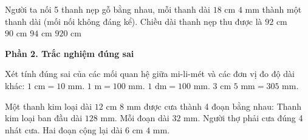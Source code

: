 \begin{ex} %
Người ta nối 5 thanh nẹp gỗ bằng nhau, mỗi thanh dài $18\text{ cm } 4\text{ mm}$ thành một thanh dài (mối nối không đáng kể). Chiều dài thanh nẹp thu được là
\choice
{\True $92\text{ cm}$}
{$90\text{ cm}$}
{$94\text{ cm}$}
{$920\text{ cm}$}
\end{ex}

\textbf{Phần 2. Trắc nghiệm đúng sai}

\begin{ex} %
Xét tính đúng sai của các mối quan hệ giữa mi-li-mét và các đơn vị đo độ dài khác:
\choiceTF
{\True $1\text{ cm} = 10\text{ mm}$.}
{$1\text{ m} = 100\text{ mm}$.}
{\True $1\text{ dm} = 100\text{ mm}$.}
{$3\text{ cm } 5\text{ mm} = 305\text{ mm}$.}
\end{ex}

\begin{ex} %
Một thanh kim loại dài $12\text{ cm } 8\text{ mm}$ được cưa thành 4 đoạn bằng nhau:
\choiceTF
{\True Thanh kim loại ban đầu dài $128\text{ mm}$.}
{\True Mỗi đoạn dài $32\text{ mm}$.}
{Người thợ phải cưa đúng 4 nhát cưa.}
{\True Hai đoạn cộng lại dài $6\text{ cm } 4\text{ mm}$.}
\end{ex}

